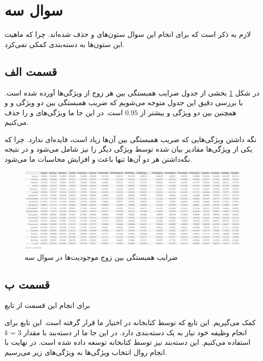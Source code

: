 \documentclass{article}
\begin{document}
\section*{سوال سه}

لازم به ذکر است که برای انجام این سوال ستون‌های  و  حذف شده‌اند. چرا
که ماهیت این ستون‌ها به دسته‌بندی کمکی نمی‌کرد.

\subsection*{قسمت الف}

در شکل \ref{corr} بخشی از جدول ضرایب همبستگی بین هر زوج از ویژگی‌ها آورده شده است.
با بررسی دقیق این جدول متوجه می‌شویم که ضریب همبستگی بین دو ویژگی  و
 و همچنین بین دو ویژگی  و  بیشتر از $0.95$ است.
در این جا ما ویژگی‌های  و  را حذف می‌کنیم.

نگه داشتن ویژگی‌هایی که ضریب همبستگی بین آن‌ها زیاد است، فایده‌ای ندارد. چرا که یکی از ویژگی‌ها
مقادیر بیان شده توسط ویژگی دیگر را نیز شامل می‌شود و در نتیجه نگه‌داشتن هر دو آن‌ها تنها باعث 
و افزایش محاسبات ما می‌شود.

\begin{figure}[h]
    \centering
    \includegraphics[width=0.7\linewidth]{images/q3/corr.png}
    \caption{ضرایب همبستگی بین زوج موجودیت‌ها در سوال سه}
    \label{corr}
\end{figure}

\subsection*{قسمت ب}

برای انجام این قسمت از تابع

\begin{center}
\end{center}

کمک می‌گیریم. این تابع که توسط کتابخانه  در اختیار ما قرار گرفته است. این تابع برای انجام
وظیفه خود نیاز به یک دسته‌بندی دارد. در این جا ما از دسته‌بند  با مقدار
$k=3$ استفاده می‌کنیم. این دسته‌بند نیز توسط کتابخانه  توسعه داده شده است.
در نهایت با انجام روال انتخاب ویژگی‌ها به ویژگی‌های زیر می‌رسیم.
\end{document}
